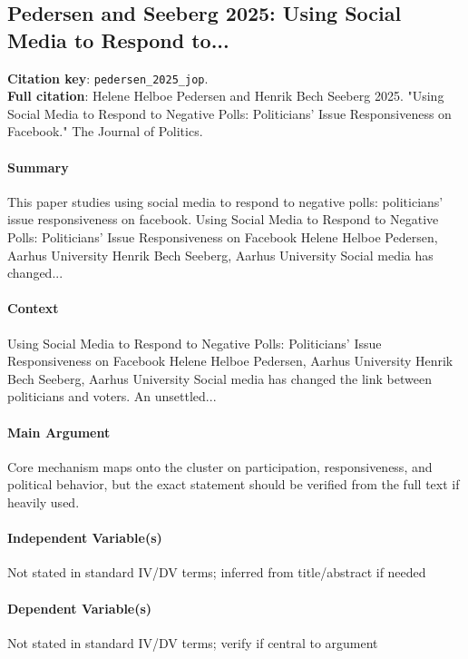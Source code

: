 \documentclass[12pt]{article}
\begin{document}
\subsection{Pedersen and Seeberg 2025: Using Social Media to Respond to...}
\textbf{Citation key}: \texttt{pedersen\_2025\_jop}.\\
\textbf{Full citation}: Helene Helboe Pedersen and Henrik Bech Seeberg 2025. "Using Social Media to Respond to Negative Polls: Politicians' Issue Responsiveness on Facebook." The Journal of Politics.

\paragraph{Summary} This paper studies using social media to respond to negative polls: politicians' issue responsiveness on facebook. Using Social Media to Respond to Negative Polls: Politicians' Issue Responsiveness on Facebook Helene Helboe Pedersen, Aarhus University Henrik Bech Seeberg, Aarhus University Social media has changed...

\paragraph{Context} Using Social Media to Respond to Negative Polls: Politicians' Issue Responsiveness on Facebook Helene Helboe Pedersen, Aarhus University Henrik Bech Seeberg, Aarhus University Social media has changed the link between politicians and voters. An unsettled...

\paragraph{Main Argument} Core mechanism maps onto the cluster on participation, responsiveness, and political behavior, but the exact statement should be verified from the full text if heavily used.

\paragraph{Independent Variable(s)} Not stated in standard IV/DV terms; inferred from title/abstract if needed

\paragraph{Dependent Variable(s)} Not stated in standard IV/DV terms; verify if central to argument
\end{document}
